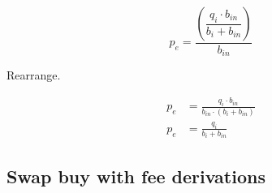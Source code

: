 \documentclass[table, twocolumn]{article}
\begin{document}
\begin{equation}
	p_e = \dfrac{\left(\dfrac{q_i \cdot b_{in}}{b_i + b_{in}}\right)}{b_{in}} \nonumber
\end{equation}

Rearrange.

\begin{align}
	p_e & = \frac{q_i \cdot b_{in}}{b_{in} \cdot (b_i + b_{in})} \nonumber \\
	p_e & = \frac{q_i}{b_i + b_{in}} \nonumber
\end{align}

\subsection{Swap buy with fee derivations}\label{ssec:swap-buy-with-fee-derivations}












\end{document}

